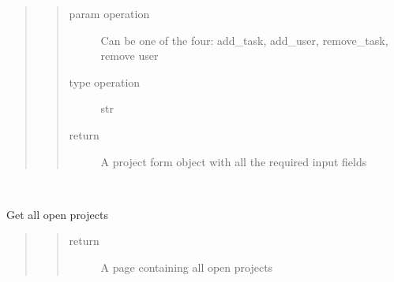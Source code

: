 \documentclass[letterpaper,10pt,english]{sphinxmanual}
\begin{document}
\begin{fulllineitems}
\begin{fulllineitems}
\begin{quote}
\begin{quote}
\begin{description}
\item[{param operation}] \leavevmode
Can be one of the four: add\_task, add\_user, remove\_task, remove user

\item[{type operation}] \leavevmode
str

\item[{return}] \leavevmode
A project form object with all the required input fields

\end{description}\end{quote}
\end{quote}

\end{fulllineitems}


\end{fulllineitems}


\begin{fulllineitems}
\label{\detokenize{index:views.open_projects.Open_projects}}~

\begin{fulllineitems}
\label{\detokenize{index:views.open_projects.Open_projects.GET}}
Get all open projects
\begin{quote}
\begin{quote}\begin{description}
\item[{return}] \leavevmode
A page containing all open projects

\end{description}\end{quote}
\end{quote}

\end{fulllineitems}


\end{fulllineitems}

\end{document}
